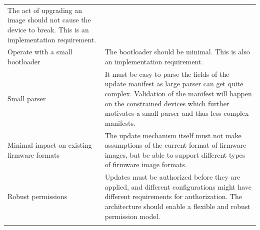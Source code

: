 \documentclass[0-thesis.tex]{subfiles}
\begin{document}
\begin{small}
\begin{longtable}[]{@{}ll@{}}
\begin{minipage}[t]{0.53\columnwidth}
        The act of upgrading an image should not cause the device to break. This
        is an implementation requirement.\strut
        \end{minipage}\tabularnewline
        \begin{minipage}[t]{0.41\columnwidth}\raggedright\strut
        Operate with a small bootloader\strut
        \end{minipage} & \begin{minipage}[t]{0.53\columnwidth}\raggedright\strut
        The bootloader should be minimal. This is also an implementation
        requirement.\strut
        \end{minipage}\tabularnewline
        \begin{minipage}[t]{0.41\columnwidth}\raggedright\strut
        Small parser\strut
        \end{minipage} & \begin{minipage}[t]{0.53\columnwidth}\raggedright\strut
        It must be easy to parse the fields of the update manifest as large
        parser can get quite complex. Validation of the manifest will happen on
        the constrained devices which further motivates a small parser and thus
        less complex manifests.\strut
        \end{minipage}\tabularnewline
        \begin{minipage}[t]{0.41\columnwidth}\raggedright\strut
        Minimal impact on existing firmware formats\strut
        \end{minipage} & \begin{minipage}[t]{0.53\columnwidth}\raggedright\strut
        The update mechanism itself must not make assumptions of the current
        format of firmware images, but be able to support different types of
        firmware image formats.\strut
        \end{minipage}\tabularnewline
        \begin{minipage}[t]{0.41\columnwidth}\raggedright\strut
        Robust permissions\strut
        \end{minipage} & \begin{minipage}[t]{0.53\columnwidth}\raggedright\strut
        Updates must be authorized before they are applied, and different
        configurations might have different requirements for authorization. The
        architecture should enable a flexible and robust permission model.\strut
        \end{minipage}\tabularnewline
        \begin{minipage}[t]{0.41\columnwidth}\raggedright\strut

\end{minipage}
\end{longtable}
\end{small}
\end{document}
